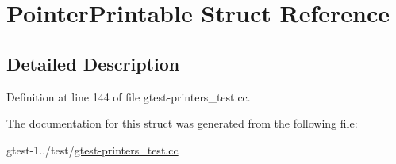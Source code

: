 \hypertarget{structfoo_1_1PointerPrintable}{\section{\-Pointer\-Printable \-Struct \-Reference}
\label{d6/d25/structfoo_1_1PointerPrintable}
}


\subsection{\-Detailed \-Description}


\-Definition at line 144 of file gtest-\/printers\-\_\-test.\-cc.



\-The documentation for this struct was generated from the following file\-:\begin{DoxyCompactItemize}
\item 
gtest-\/1../test/\hyperlink{gtest-printers__test_8cc}{gtest-\/printers\-\_\-test.\-cc}\end{DoxyCompactItemize}
